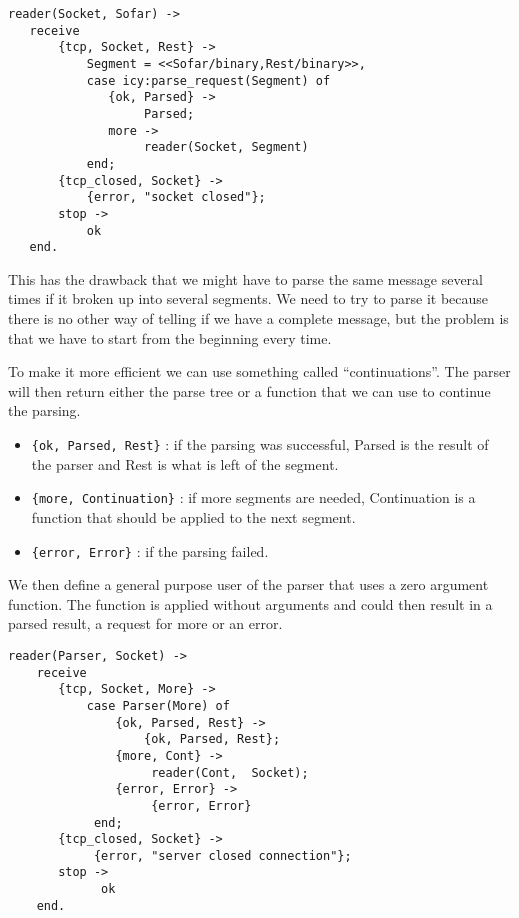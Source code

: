 \documentclass[a4paper,dvips,11pt]{article}
\begin{document}
\begin{verbatim}
reader(Socket, Sofar) ->
   receive
       {tcp, Socket, Rest} ->
           Segment = <<Sofar/binary,Rest/binary>>,
           case icy:parse_request(Segment) of
              {ok, Parsed} -> 
                   Parsed;
              more ->
                   reader(Socket, Segment)
           end;
       {tcp_closed, Socket} ->
           {error, "socket closed"};
       stop ->
           ok
   end.
\end{verbatim}

This has the drawback that we might have to parse the same message
several times if it broken up into several segments. We need to try to
parse it because there is no other way of telling if we have a complete
message, but the problem is that we have to start from the beginning
every time.


To make it more efficient we can use something called
``continuations''. The parser will then return either the parse tree
or a function that we can use to continue the parsing. 

\begin{itemize}

 \item {\tt \{ok, Parsed, Rest\}} : if the parsing was successful,
   Parsed is the result of the parser and Rest is what is left of the
   segment.

 \item {\tt \{more, Continuation\}} : if more segments are needed,
   Continuation is a function that should be applied to the next segment.

 \item {\tt \{error, Error\}} : if the parsing failed.

\end{itemize}

We then define a general purpose user of the parser that uses a zero
argument function. The function is applied without arguments and
could then result in a parsed result, a request for more or an error. 

\begin{verbatim}
reader(Parser, Socket) ->
    receive
       {tcp, Socket, More} ->
           case Parser(More) of
               {ok, Parsed, Rest} ->
                   {ok, Parsed, Rest};
               {more, Cont} ->
                    reader(Cont,  Socket);
               {error, Error} ->
                    {error, Error}
            end;
       {tcp_closed, Socket} ->
            {error, "server closed connection"};
       stop ->
             ok
    end.
\end{verbatim}
\end{document}
